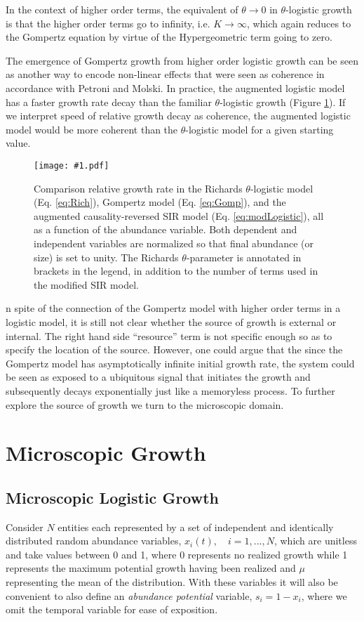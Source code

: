 \documentclass{article}
\newcommand{\insertPdfFig}[3]{
  \begin{figure}[H]
  \centering
  \texttt{[image: \#1.pdf]}
  \caption{#2}
  \label{fig:#1}
  \end{figure}
}
\begin{document}
 In the context of higher order terms, the equivalent of $\theta\rightarrow 0$ in $\theta$-logistic growth is that the higher order terms go to infinity, i.e. $K \rightarrow \infty$, which again reduces to the Gompertz equation by virtue of the Hypergeometric term going to zero. 

 The emergence of Gompertz growth from higher order logistic growth can be seen as another way to encode non-linear effects that were seen as coherence in accordance with Petroni and Molski. In practice, the augmented logistic model has a faster growth rate decay than the familiar $\theta$-logistic growth (Figure \ref{fig:hypergeometric_plain}). If we interpret speed of relative growth decay as coherence, the augmented logistic model would be more coherent than the $\theta$-logistic model for a given starting value. 

\insertPdfFig{hypergeometric_plain}{Comparison relative growth rate in the Richards $\theta$-logistic model (Eq. \ref{eq:Rich}), Gompertz model (Eq. \ref{eq:Gomp}), and the augmented causality-reversed SIR model (Eq. \ref{eq:modLogistic}), all as a function of the abundance variable. Both dependent and independent variables are normalized so that final abundance (or size) is set to unity. The Richards $\theta$-parameter is annotated in brackets in the legend, in addition to the number of terms used in the modified SIR model.} 

In spite of the connection of the Gompertz model with higher order terms in a logistic model, it is still not clear whether the source of growth is external or internal. The right hand side ``resource'' term is not specific enough so as to specify the location of the source. However, one could argue that the since the Gompertz model has asymptotically infinite initial growth rate, the system could be seen as exposed to a ubiquitous signal that initiates the growth and subsequently decays exponentially just like a memoryless process. To further explore the source of growth we turn to the microscopic domain.

\section{Microscopic Growth}
\label{sec:micro}

\subsection{Microscopic Logistic Growth}
Consider $N$ entities each represented by a set of independent and identically distributed random abundance variables, $x_i(t), \quad i=1, ..., N$, which are unitless and take values between 0 and 1, where 0 represents no realized growth while 1 represents the maximum potential growth having been realized and $\mu$ representing the mean of the distribution. With these variables it will also be convenient to also define an \textit{abundance potential} variable, $s_i = 1 - x_i$, where we omit the temporal variable for ease of exposition.
\end{document}
